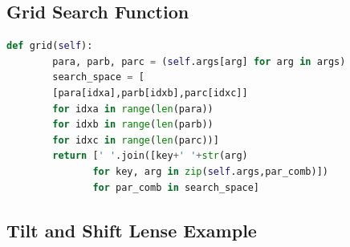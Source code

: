 \newpage

\subsection{Grid Search Function}
\label{grid_search}

\begin{lstlisting}[language=Python, frame=single, label={lst:grid}, caption={Grid Search Hyper Parameters}]
def grid(self):
        para, parb, parc = (self.args[arg] for arg in args)
        search_space = [
        [para[idxa],parb[idxb],parc[idxc]] 
        for idxa in range(len(para)) 
        for idxb in range(len(parb))
        for idxc in range(len(parc))]
        return [' '.join([key+' '+str(arg) 
               for key, arg in zip(self.args,par_comb)]) 
               for par_comb in search_space]
\end{lstlisting}
\newpage
\subsection{Tilt and Shift Lense Example}
\label{sec:tilt shift}


